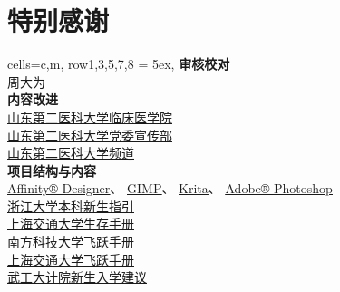 \chapter*{特别感谢}
\begin{table}[H]
    \centering
    \begin{tblr}[
            theme = {no-caption},
        ]{
            cells={c,m},
            row{1,3,5,7,8} = {5ex},
        }
        {\large\textbf{审核校对}}                                                                 \\
        {周大为}                                                                                  \\
        {\large\textbf{内容改进}}                                                                 \\
        {
        \uline{\href{https://xchb.sdsmu.edu.cn}{山东第二医科大学临床医学院}}                      \\
        \uline{\href{https://xchb.sdsmu.edu.cn}{山东第二医科大学党委宣传部}}                      \\
        \uline{\href{https://pd.qq.com/s/7mekdr5ve}{山东第二医科大学频道}}
        }                                                                                         \\
        {\large\textbf{项目结构与内容}}                                                           \\
        {
        \uline{\href{https://affinity.serif.com/zh-cn/designer}{Affinity® Designer}}、%
        \uline{\href{https://www.gimp.org/}{GIMP}}、%
        \uline{\href{https://krita.org/zh-cn}{Krita}}、%
        \uline{\href{https://www.adobe.com/cn/creativecloud/roc/business.html}{Adobe® Photoshop}} \\
        \uline{\href{https://zjuers.com/welcome}{浙江大学本科新生指引}}                           \\
        \uline{\href{https://survivesjtu.gitbook.io/survivesjtumanual}{上海交通大学生存手册}}     \\
        \uline{\href{https://sustech-application.com}{南方科技大学飞跃手册}}                      \\
        \uline{\href{https://survivesjtu.github.io/SJTU-Application}{上海交通大学飞跃手册}}       \\
        \uline{\href{https://gitee.com/hanyaner/witjij}{武工大计院新生入学建议}}
        }                                                                                         \\

\end{tblr}
\end{table}
